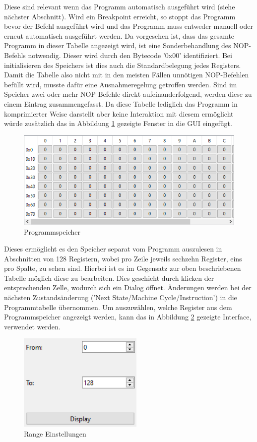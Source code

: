 \documentclass[12pt]{article}
\newcommand{\imgSpaceBefore}{\vspace{10pt}}
\begin{document}
\noindent
Diese sind relevant wenn das Programm automatisch ausgeführt wird (siehe nächster Abschnitt). Wird ein Breakpoint erreicht, so stoppt das Programm bevor der Befehl ausgeführt wird und das Programm muss entweder manuell oder erneut automatisch ausgeführt werden. Da vorgesehen ist, dass das gesamte Programm in dieser Tabelle angezeigt wird, ist eine Sonderbehandlung des NOP-Befehls notwendig. Dieser wird durch den Bytecode '0x00' identifiziert. Bei initialisieren des Speichers ist dies auch die Standardbelegung jedes Registers. Damit die Tabelle also nicht mit in den meisten Fällen unnötigen NOP-Befehlen befüllt wird, musste dafür eine Ausnahmeregelung getroffen werden. Sind im Speicher zwei oder mehr NOP-Befehle direkt aufeinanderfolgend, werden diese zu einem Eintrag zusammengefasst. Da diese Tabelle lediglich das Programm in komprimierter Weise darstellt aber keine Interaktion mit diesem ermöglicht würde zusätzlich das in Abbildung \ref{fig:ProgSpeicher} gezeigte Fenster in die GUI eingefügt.\imgSpaceBefore

\begin{figure}[H]
\centering
\includegraphics[width=12cm]{bilder/ProgramMemory}
\caption{Programmspeicher}
\label{fig:ProgSpeicher}
\end{figure}

\noindent
Dieses ermöglicht es den Speicher separat vom Programm auszulesen in Abschnitten von 128 Registern, wobei pro Zeile jeweils sechzehn Register, eins pro Spalte, zu sehen sind. Hierbei ist es im Gegensatz zur oben beschriebenen Tabelle möglich diese zu bearbeiten. Dies geschieht durch klicken der entsprechenden Zelle, wodurch sich ein Dialog öffnet. Änderungen werden bei der nächsten Zustandsänderung ('Next State/Machine Cycle/Instruction') in die Programmtabelle übernommen. Um auszuwählen, welche Register aus dem Programmspeicher angezeigt werden, kann das in Abbildung \ref{fig:Range} gezeigte Interface, verwendet werden.\imgSpaceBefore

\begin{figure}[h]
\centering
\includegraphics[width=6cm]{bilder/Range}
\caption{Range Einstellungen}
\label{fig:Range}
\end{figure}
\end{document}
